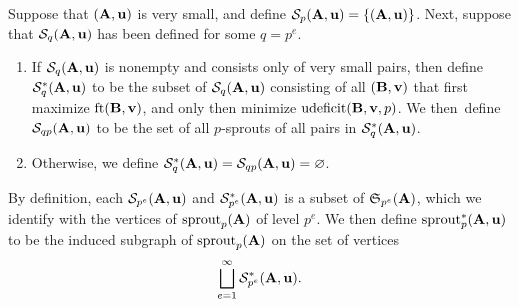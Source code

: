 \documentclass{amsart}
\begin{document}
\begin{definition}
   Suppose that $(\mathbf{A},\mathbf{u})$ is very small, and define $\mathcal{S}_p(\mathbf{A},\mathbf{u}) = \{ (\mathbf{A},\mathbf{u}) \}$.
   Next, suppose that $\mathcal{S}_q(\mathbf{A},\mathbf{u})$ has been defined for some $q=p^e$.
   \begin{enumerate}
      \item If $\mathcal{S}_q(\mathbf{A},\mathbf{u})$ is nonempty and consists only of very small pairs, then define $\mathcal{S}^{\ast}_q(\mathbf{A},\mathbf{u})$ to be the subset of $\mathcal{S}_q(\mathbf{A},\mathbf{u})$ consisting of all $(\mathbf{B},\mathbf{v})$ that first maximize $\operatorname{ft}(\mathbf{B}, \mathbf{v})$, and only then minimize $\operatorname{udeficit}(\mathbf{B},\mathbf{v},p)$.  We then~define~$\mathcal{S}_{qp}(\mathbf{A},\mathbf{u})$ to be the set of all $p$-sprouts of all pairs in $\mathcal{S}^{\ast}_q(\mathbf{A},\mathbf{u})$.
      \item Otherwise, we define $\mathcal{S}_q^{\ast}(\mathbf{A},\mathbf{u})=\mathcal{S}_{qp}(\mathbf{A},\mathbf{u}) = \varnothing$.
   \end{enumerate}
   By definition, each $\mathcal{S}_{p^e}(\mathbf{A},\mathbf{u})$ and $\mathcal{S}^{\ast}_{p^e}(\mathbf{A},\mathbf{u})$ is a subset of $\mathfrak{S}_{p^e}(\mathbf{A})$, which we identify with the vertices of $\operatorname{sprout}_p(\mathbf{A})$ of level $p^e$.
   We then define $\operatorname{sprout}_p^{\ast}(\mathbf{A},\mathbf{u})$ to be the induced subgraph of $\operatorname{sprout}_p(\mathbf{A})$ on the set of vertices
   \[ \bigsqcup_{e=1}^{\infty} \mathcal{S}^{\ast}_{p^e}(\mathbf{A},\mathbf{u}). \]
\end{definition}
\end{document}
